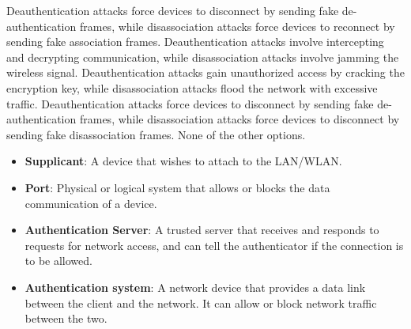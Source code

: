 \begin{checkboxes}
    \choice Deauthentication attacks force devices to disconnect by sending fake de-authentication frames, while disassociation attacks force devices to reconnect by sending fake association frames.
    \choice Deauthentication attacks involve intercepting and decrypting communication, while disassociation attacks involve jamming the wireless signal.
    \choice Deauthentication attacks gain unauthorized access by cracking the encryption key, while disassociation attacks flood the network with excessive traffic.
    \CorrectChoice Deauthentication attacks force devices to disconnect by sending fake de-authentication frames, while disassociation attacks force devices to disconnect by sending fake disassociation frames.
    \choice None of the other options.
\end{checkboxes}

\begin{solution}
    \begin{itemize}
        \item \textbf{Supplicant}: A device that wishes to attach to the LAN/WLAN.
        \item \textbf{Port}: Physical or logical system that allows or blocks the data communication of a device.
        \item \textbf{Authentication Server}: A trusted server that receives and responds to requests for network access, and can tell the authenticator if the connection is to be allowed.
        \item \textbf{Authentication system}: A network device that provides a data link between the client and the network. It can allow or block network traffic between the two.
    \end{itemize}
\end{solution}